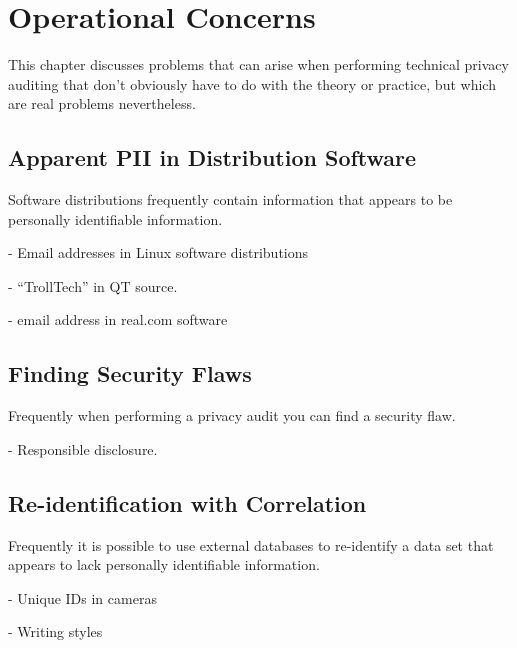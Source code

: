 \chapter{Operational Concerns}

This chapter discusses problems that can arise when performing
technical privacy auditing that don't obviously have to do with the
theory or practice, but which are real problems nevertheless.

\section{Apparent PII in Distribution Software}
Software distributions frequently contain information that appears to
be personally identifiable information. 

- Email addresses in Linux software distributions

- ``TrollTech'' in QT source.

- email address in real.com software

\section{Finding Security Flaws}

Frequently when performing a privacy audit you can find a security
flaw. 

- Responsible disclosure.

\section{Re-identification with Correlation}

Frequently it is possible to use external databases to re-identify
a data set that appears to lack personally identifiable information.

- Unique IDs in cameras

- Writing styles

